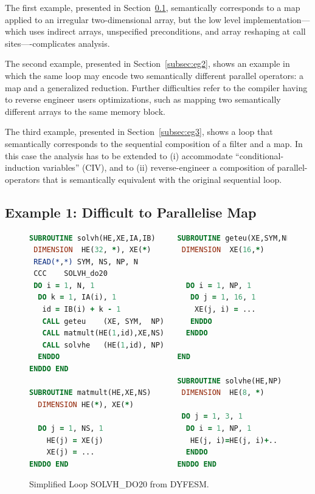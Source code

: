 The first example, presented in Section~\ref{subsec:eg1}, semantically
corresponds to a map applied to an irregular two-dimensional array,
but the low level implementation---which uses indirect arrays,
unspecified preconditions, and array reshaping at call
sites----complicates analysis.

The second example, presented in Section~\ref{subsec:eg2}, shows an
example in which the same loop may encode two semantically different
parallel operators: a map and a generalized reduction.  Further
difficulties refer to the compiler having to reverse engineer users
optimizations, such as mapping two semantically different arrays to
the same memory block.

The third example, presented in Section~\ref{subsec:eg3}, shows a loop
that semantically corresponds to the sequential composition of a
filter and a map.  In this case the analysis has to be extended to (i)
accommodate ``conditional-induction variables'' (CIV), and to (ii)
reverse-engineer a composition of parallel-operators that is
semantically equivalent with the original sequential loop.

\subsection{Example 1: Difficult to Parallelise Map}
\label{subsec:eg1}

\begin{figure}[bt]

\begin{lstlisting}[language=fortran]
SUBROUTINE solvh(HE,XE,IA,IB)     SUBROUTINE geteu(XE,SYM,NP)
 DIMENSION  HE(32, *), XE(*)       DIMENSION  XE(16,*)
 READ(*,*) SYM, NS, NP, N
 CCC    SOLVH_do20
 DO i = 1, N, 1                     DO i = 1, NP, 1
  DO k = 1, IA(i), 1                 DO j = 1, 16, 1
   id = IB(i) + k - 1                 XE(j, i) = ...
   CALL geteu    (XE, SYM,  NP)      ENDDO
   CALL matmult(HE(1,id),XE,NS)     ENDDO
   CALL solvhe   (HE(1,id), NP)
  ENDDO                           END
ENDDO END
                                  SUBROUTINE solvhe(HE,NP)
SUBROUTINE matmult(HE,XE,NS)       DIMENSION  HE(8, *)
  DIMENSION HE(*), XE(*)
                                   DO j = 1, 3, 1
  DO j = 1, NS, 1                   DO i = 1, NP, 1
    HE(j) = XE(j)                    HE(j, i)=HE(j, i)+..
    XE(j) = ...                     ENDDO
ENDDO END                         ENDDO END
\end{lstlisting}

\caption{Simplified Loop SOLVH\_DO20 from DYFESM.}
\label{fig:SolvhDO20Code}
\end{figure}

